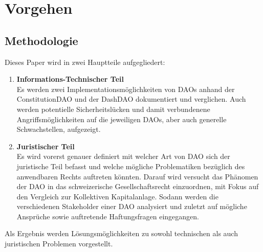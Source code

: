 \documentclass[a4paper,12pt]{report}
\begin{document}
	
	\chapter{Vorgehen}
	
	\section{Methodologie}
	\startsection
	    Dieses Paper wird in zwei Hauptteile aufgegliedert:
	    \begin{enumerate}
	        \item \textbf{Informations-Technischer Teil} \\
	        Es werden zwei Implementationsmöglichkeiten von DAOs anhand der ConstitutionDAO und der DashDAO dokumentiert und verglichen. Auch werden potentielle Sicherheitslücken und damit verbundenene Angriffsmöglichkeiten auf die jeweiligen DAOs, aber auch generelle Schwachstellen, aufgezeigt.
	        \item \textbf{Juristischer Teil} \\
	        Es wird vorerst genauer definiert mit welcher Art von DAO sich der juristische Teil befasst und welche mögliche Problematiken bezüglich des anwendbaren Rechts auftreten könnten. Darauf wird versucht das Phänomen der DAO in das schweizerische Gesellschaftsrecht einzuordnen, mit Fokus auf den Vergleich zur Kollektiven Kapitalanlage. Sodann werden die verschiedenen Stakeholder einer DAO analysiert und zuletzt auf mögliche Ansprüche sowie auftretende Haftungsfragen eingegangen.
	    \end{enumerate}
	    Als Ergebnis werden Lösungsmöglichkeiten zu sowohl technischen als auch juristischen Problemen vorgestellt.
	\closesection
	
\end{document}
